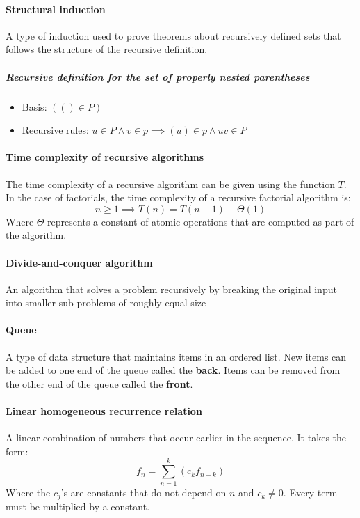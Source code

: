\documentclass[a4paper]{article}
\begin{document}
\paragraph{Structural induction} A type of induction used to prove theorems about recursively defined sets that follows the structure of the recursive definition.
\subparagraph{Recursive definition for the set of properly nested parentheses}
\begin{itemize}
  \item Basis: $( () \in P)$
  \item Recursive rules: $u \in P \land v \in p \implies (u) \in p \land uv \in P$
\end{itemize}
\paragraph{Time complexity of recursive algorithms} The time complexity of a recursive algorithm can be given using the function $T$. In the case of factorials, the time complexity of a recursive factorial algorithm is:
\begin{equation*}
  n \geq 1 \implies T(n) = T(n-1) + \Theta (1)
\end{equation*}
Where $\Theta$ represents a constant of atomic operations that are computed as part of the algorithm.
\paragraph{Divide-and-conquer algorithm} An algorithm that solves a problem recursively by breaking the original input into smaller sub-problems of roughly equal size
\paragraph{Queue} A type of data structure that maintains items in an ordered list. New items can be added to one end of the queue called the \textbf{back}. Items can be removed from the other end of the queue called the \textbf{front}.
\paragraph{Linear homogeneous recurrence relation} A linear combination of numbers that occur earlier in the sequence. It takes the form:
\begin{equation*}
  f_n = \sum_{n=1}^{k} (c_k f_{n - k})
\end{equation*}
Where the $c_j$'s are constants that do not depend on $n$ and $c_k \neq 0$. Every term must be  multiplied by a constant.
\end{document}
